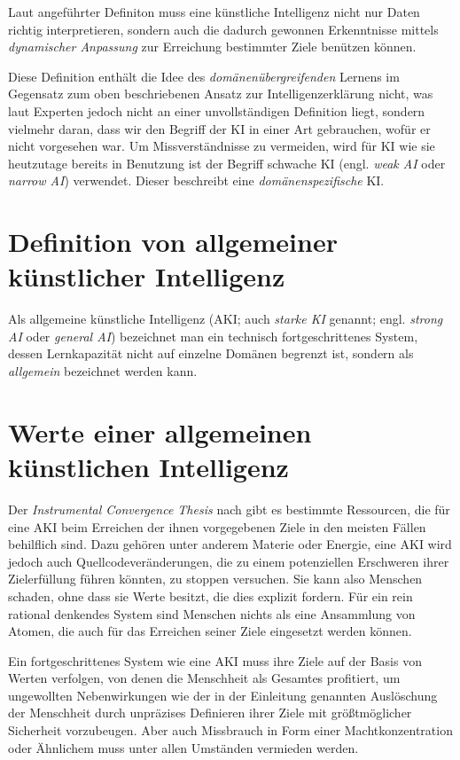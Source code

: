Laut angeführter Definiton muss eine künstliche Intelligenz nicht nur Daten richtig interpretieren, sondern auch die dadurch gewonnen Erkenntnisse mittels \emph{dynamischer Anpassung} zur Erreichung bestimmter Ziele benützen können.

Diese Definition enthält die Idee des \emph{domänenübergreifenden} Lernens im Gegensatz zum oben beschriebenen Ansatz zur Intelligenzerklärung nicht, was laut Experten jedoch nicht an einer unvollständigen Definition liegt, sondern vielmehr daran, dass wir den Begriff der KI in einer Art gebrauchen, wofür er nicht vorgesehen war. Um Missverständnisse zu vermeiden, wird für KI wie sie heutzutage bereits in Benutzung ist der Begriff schwache KI (engl. \emph{weak AI} oder \emph{narrow AI}) verwendet.  Dieser beschreibt eine \emph{domänenspezifische} KI.

\section{Definition von allgemeiner künstlicher Intelligenz}
Als allgemeine künstliche Intelligenz (AKI; auch \emph{starke KI} genannt; engl. \emph{strong AI} oder \emph{general AI}) bezeichnet man ein technisch fortgeschrittenes System, dessen Lernkapazität nicht auf einzelne Domänen begrenzt ist, sondern als \emph{allgemein} bezeichnet werden kann. 

\section{Werte einer allgemeinen künstlichen Intelligenz}
Der \emph{Instrumental Convergence Thesis} nach gibt es bestimmte Ressourcen, die für eine AKI beim Erreichen der ihnen vorgegebenen Ziele in den meisten Fällen behilflich sind. Dazu gehören unter anderem Materie oder Energie, eine AKI wird jedoch auch Quellcodeveränderungen, die zu einem potenziellen Erschweren ihrer Zielerfüllung führen könnten, zu stoppen versuchen. Sie kann also Menschen schaden, ohne dass sie Werte besitzt, die dies explizit fordern. Für ein rein rational denkendes System sind Menschen nichts als eine Ansammlung von Atomen, die auch für das Erreichen seiner Ziele eingesetzt werden können.

Ein fortgeschrittenes System wie eine AKI muss ihre Ziele auf der Basis von Werten verfolgen, von denen die Menschheit als Gesamtes profitiert, um ungewollten Nebenwirkungen wie der in der Einleitung genannten Auslöschung der Menschheit durch unpräzises Definieren ihrer Ziele mit größtmöglicher Sicherheit vorzubeugen. Aber auch Missbrauch in Form einer Machtkonzentration oder Ähnlichem muss unter allen Umständen vermieden werden.

